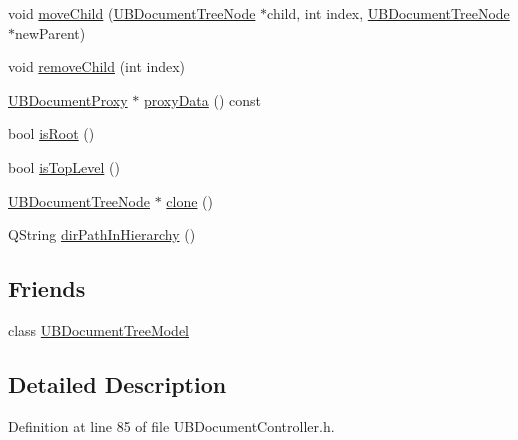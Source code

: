 \begin{DoxyCompactItemize}
void \hyperlink{class_u_b_document_tree_node_a8c78509d2ac0e935a4bb51db63a81d63}{move\-Child} (\hyperlink{class_u_b_document_tree_node}{U\-B\-Document\-Tree\-Node} $\ast$child, int index, \hyperlink{class_u_b_document_tree_node}{U\-B\-Document\-Tree\-Node} $\ast$new\-Parent)
\item 
void \hyperlink{class_u_b_document_tree_node_a37320f5b69863f36bc246e1117fa6988}{remove\-Child} (int index)
\item 
\hyperlink{class_u_b_document_proxy}{U\-B\-Document\-Proxy} $\ast$ \hyperlink{class_u_b_document_tree_node_a089338d403f60b36f8fc64b8e05f176f}{proxy\-Data} () const 
\item 
bool \hyperlink{class_u_b_document_tree_node_aadaad2c7879c1efbe8e3752e458ff8ff}{is\-Root} ()
\item 
bool \hyperlink{class_u_b_document_tree_node_ad23306f658b7dd39203d358ab8c288b0}{is\-Top\-Level} ()
\item 
\hyperlink{class_u_b_document_tree_node}{U\-B\-Document\-Tree\-Node} $\ast$ \hyperlink{class_u_b_document_tree_node_a4f1f69c4cc82b3e0edce6a669623b532}{clone} ()
\item 
Q\-String \hyperlink{class_u_b_document_tree_node_ae5474ecc93987400a4050aba8cf16cb6}{dir\-Path\-In\-Hierarchy} ()
\end{DoxyCompactItemize}
\subsection*{Friends}
\begin{DoxyCompactItemize}
\item 
class \hyperlink{class_u_b_document_tree_node_a67c37643a244d3a945253d93304fb8ff}{U\-B\-Document\-Tree\-Model}
\end{DoxyCompactItemize}


\subsection{Detailed Description}


Definition at line 85 of file U\-B\-Document\-Controller.\-h.



